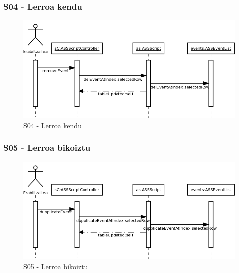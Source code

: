 \subsubsection{S04 - Lerroa kendu}
\begin{figure}[htp]
\begin{center}
\includegraphics[scale=0.35]{Pictures/Chapter4/Diseinua/S04.png}
\caption{S04 - Lerroa kendu}
\label{s04d}
\end{center}
\end{figure}


\subsubsection{S05 - Lerroa bikoiztu}
\begin{figure}[htp]
\begin{center}
\includegraphics[scale=0.35]{Pictures/Chapter4/Diseinua/S05.png}
\caption{S05 - Lerroa bikoiztu}
\label{s05d}
\end{center}
\end{figure}

\newpage
